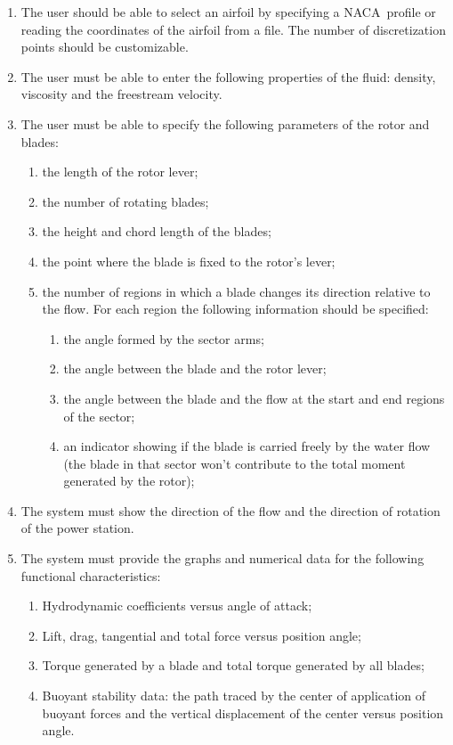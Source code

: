 \begin{enumerate}[topsep=5pt, partopsep=0pt,itemsep=3pt,parsep=1pt]
\item The user should be able to select an airfoil by specifying a NACA\
profile or reading the coordinates of the airfoil from a file. The number of
discretization points should be customizable.
\item The user must be able to enter the following properties of the fluid:
density, viscosity and the freestream velocity.
\item The user must be able to specify the following parameters of the rotor
and blades:
   \begin{enumerate}
   \item the length of the rotor lever;
   \item the number of rotating blades;
   \item the height and chord length of the blades;
   \item the point where the blade is fixed to the rotor's lever;
   \item the number of regions in which a blade changes its direction relative
           to the flow. For each region the following information should be specified:
       \begin{enumerate}
       \item the angle formed by the sector arms;
       \item the angle between the blade and the rotor lever;
       \item the angle between the blade and the flow at the start and end regions of the sector;
        \item an indicator showing if the blade is carried freely by the water flow (the blade in that sector won't contribute to the total                 
                moment generated by the rotor);
       \end{enumerate}
    \end{enumerate}
\item The system must show the direction of the flow and the direction of rotation of the power station.
\item The system must provide the graphs and numerical data for the following functional characteristics:
   \begin{enumerate}
   \item Hydrodynamic coefficients versus angle of attack;
   \item Lift, drag, tangential and total force versus position angle;
   \item Torque generated by a blade and total torque generated by all blades;
   \item Buoyant stability data: the path traced by the center of application of buoyant forces and the vertical displacement of the center versus position angle.
   \end{enumerate}
\end{enumerate}

